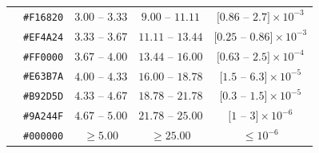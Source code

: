 \documentclass[11pt]{article}
\begin{document}
\begin{table}[htbp]
{\begin{tabular}{|c|c|c|c|c|}
\hline
\cellcolor[HTML]{F16820} & \texttt{\#F16820} 
& $ 3.00$ -- $3.33 $  &  $ 9.00$ -- $11.11 $  &  
$ [0.86$ -- $2.7]\times 10^{-3}$ 
\\
\cellcolor[HTML]{EF4A24} & \texttt{\#EF4A24}
& $ 3.33$ -- $3.67 $  &  $ 11.11$ -- $13.44 $  &  
$ [0.25$ -- $0.86]\times10^{-3} $
\\
\cellcolor[HTML]{FF0000} & \texttt{\#FF0000}
& $ 3.67$ -- $4.00 $  &  $ 13.44$ -- $16.00 $  &  
$ [0.63$ -- $2.5]\times10^{-4} $
\\
\hline
\cellcolor[HTML]{E63B7A} & \texttt{\#E63B7A}
& $ 4.00$ -- $4.33 $  &  $ 16.00$ -- $18.78 $  &  $ [1.5$ -- $6.3]\times10^{-5} $
\\
\cellcolor[HTML]{B92D5D} & \texttt{\#B92D5D} 
& $ 4.33$ -- $4.67 $  &  $ 18.78$ -- $21.78 $  &  $ [0.3$ -- $1.5]\times10^{-5} $
\\
\cellcolor[HTML]{9A244F} & \texttt{\#9A244F}
& $ 4.67$ -- $5.00 $  &  $ 21.78$ -- $25.00 $  &  $ [1$ -- $3]\times10^{-6} $
\\
\hline
\cellcolor[HTML]{000000} & \texttt{\#000000} 
& $\ge 5.00$ & $\ge 25.00$ & $\le 10^{-6}$ \\
        \hline
    \end{tabular}
}
\end{table}
\end{document}
